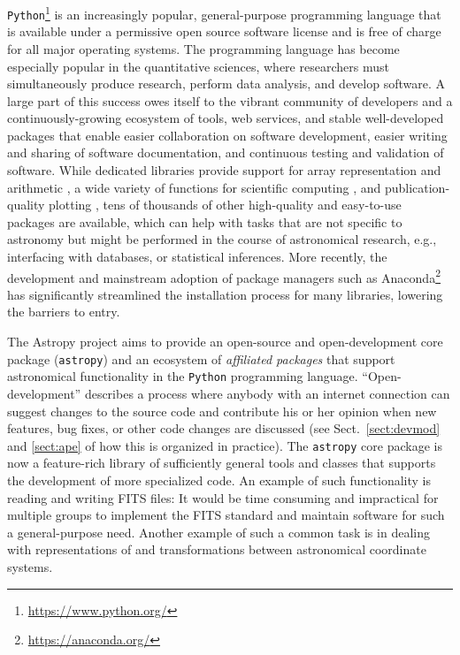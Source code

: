 \documentclass[modern]{aastex62}
\newcommand{\package}[1]{\texttt{#1}\xspace}
\newcommand{\python}{\package{Python}}
\newcommand{\astropy}{Astropy\xspace}
\newcommand{\astropypkg}{\package{astropy}}
\begin{document}
\python\footnote{\url{https://www.python.org/}} is an increasingly popular, general-purpose
programming language that is available under a permissive open source software license and is free of
charge for all major operating systems. The programming language has become especially popular
in the quantitative sciences, where researchers must simultaneously produce research, perform
data analysis, and develop software. A large part of this success owes itself to the vibrant
community of developers and a continuously-growing ecosystem of tools, web services, and stable
well-developed packages that enable easier collaboration on software development, easier
writing and sharing of software documentation, and continuous testing and validation of
software. While dedicated libraries provide support for array representation and
arithmetic \citep[\package{numpy};][]{numpy}, a wide variety of functions for scientific
computing \citep[\package{scipy};][]{scipy}, and publication-quality plotting
\citep[\package{matplotlib};][]{matplotlib}, tens of thousands of other high-quality and easy-to-use
packages are available, which can help with tasks that are not specific to astronomy but
might be performed in the course of astronomical research, e.g., interfacing with
databases, or statistical inferences.
More recently, the development and mainstream adoption of package managers such
as Anaconda\footnote{\url{https://anaconda.org/}} has significantly streamlined
the installation process for many libraries, lowering the barriers to entry.

The \astropy project aims to provide an open-source and open-development core
package (\astropypkg) and an ecosystem of \emph{affiliated packages} that
support astronomical functionality in the \python programming language.
``Open-development'' describes a process where anybody with an internet connection can suggest changes to the source code and contribute his or her opinion when new features, bug fixes, or other code changes are discussed (see Sect.~\ref{sect:devmod} and \ref{sect:ape} of how this is organized in practice).
The \astropypkg core package is now a feature-rich library of sufficiently
general tools and classes that supports the development of more specialized
code. An example of such functionality is reading and writing FITS files: It would be
time consuming and impractical for multiple groups to implement the FITS
standard \citep{FITS} and maintain software for such a general-purpose need.
Another example of such a common task is in dealing with representations of and
transformations between astronomical coordinate systems.
\end{document}
